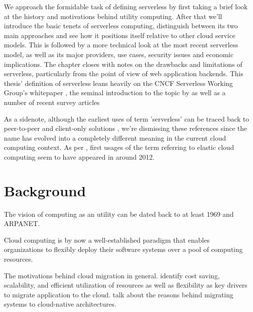 \documentclass[utf8,english]{gradu3}
\begin{document}
We approach the formidable task of defining serverless by first taking a brief look at the history and motivations behind utility computing. After that we'll introduce the basic tenets of serverless computing, distinguish between its two main approaches and see how it positions itself relative to other cloud service models. This is followed by a more technical look at the most recent serverless model, as well as its major providers, use cases, security issues and economic implications. The chapter closes with notes on the drawbacks and limitations of serverless, particularly from the point of view of web application backends. This thesis' definition of serverless leans heavily on the CNCF Serverless Working Group's whitepaper \parencite{cncf18serverlessWG}, the seminal introduction to the topic by \textcite{robert2016serverlessarchitectures} as well as a number of recent survey articles \parencite[e.g.][]{baldini17currentTrends,van2017spec,fox17}

As a sidenote, although the earliest uses of term 'serverless' can be traced back to peer-to-peer and client-only solutions \parencite{fox17}, we're dismissing these references since the name has evolved into a completely different meaning in the current cloud computing context. As per \textcite{robert2016serverlessarchitectures}, first usages of the term referring to elastic cloud computing seem to have appeared in around 2012.


\section{Background}

The vision of computing as an utility can be dated back to at least 1969 and ARPANET. \parencite{buyya09cloud}

Cloud computing is by now a well-established paradigm that enables organizations to flexibly deploy their software systems over a pool of computing resources.  \parencite{jamshidi13cloudmigrationreview}

The motivations behind cloud migration in general. \textcite{jamshidi13cloudmigrationreview} identify cost saving, scalability, and efficient utilization of resources as well as flexibility as key drivers to migrate application to the cloud. \textcite{balalaie16migratingcloud} talk about the reasons behind migrating systems to cloud-native architectures.
\end{document}
